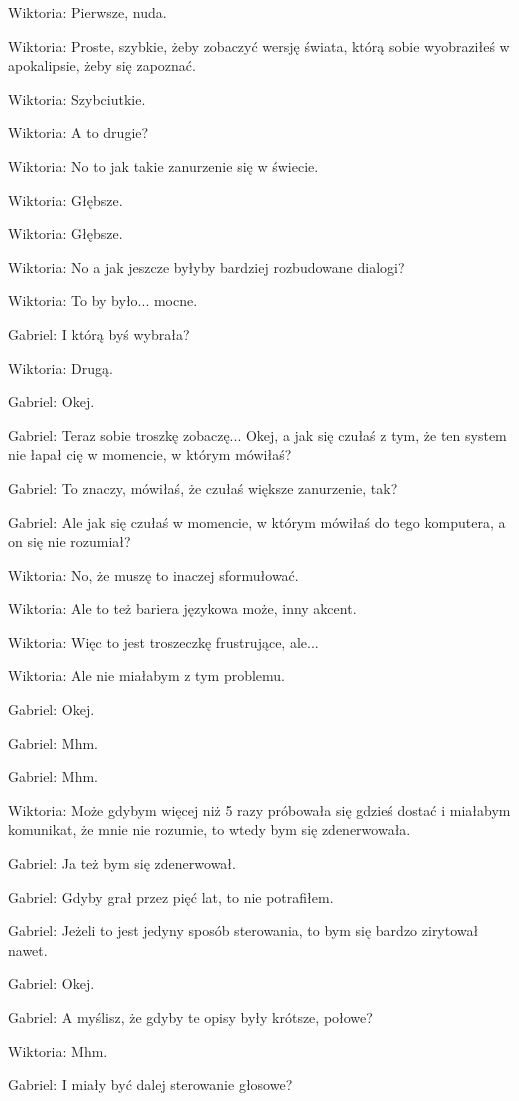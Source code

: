 Wiktoria: Pierwsze, nuda.

Wiktoria: Proste, szybkie, żeby zobaczyć wersję świata, którą sobie wyobraziłeś w apokalipsie, żeby się zapoznać.

Wiktoria: Szybciutkie.

Wiktoria: A to drugie?

Wiktoria: No to jak takie zanurzenie się w świecie.

Wiktoria: Głębsze.

Wiktoria: Głębsze.

Wiktoria: No a jak jeszcze byłyby bardziej rozbudowane dialogi?

Wiktoria: To by było... mocne.

Gabriel: I którą byś wybrała?

Wiktoria: Drugą.

Gabriel: Okej.

Gabriel: Teraz sobie troszkę zobaczę... Okej, a jak się czułaś z tym, że ten system nie łapał cię w momencie, w którym mówiłaś?

Gabriel: To znaczy, mówiłaś, że czułaś większe zanurzenie, tak?

Gabriel: Ale jak się czułaś w momencie, w którym mówiłaś do tego komputera, a on się nie rozumiał?

Wiktoria: No, że muszę to inaczej sformułować.

Wiktoria: Ale to też bariera językowa może, inny akcent.

Wiktoria: Więc to jest troszeczkę frustrujące, ale...

Wiktoria: Ale nie miałabym z tym problemu.

Gabriel: Okej.

Gabriel: Mhm.

Gabriel: Mhm.

Wiktoria: Może gdybym więcej niż 5 razy próbowała się gdzieś dostać i miałabym komunikat, że mnie nie rozumie, to wtedy bym się zdenerwowała.

Gabriel: Ja też bym się zdenerwował.

Gabriel: Gdyby grał przez pięć lat, to nie potrafiłem.

Gabriel: Jeżeli to jest jedyny sposób sterowania, to bym się bardzo zirytował nawet.

Gabriel: Okej.

Gabriel: A myślisz, że gdyby te opisy były krótsze, połowe?

Wiktoria: Mhm.

Gabriel: I miały być dalej sterowanie głosowe?

